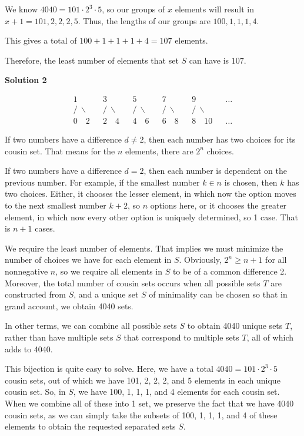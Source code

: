 \begin{enumerate}
 We know $4040 = 101 \cdot 2^3 \cdot 5$, so our groups of $x$ elements will result in $x+1 = 101, 2, 2, 2, 5$. Thus, the lengths of our groups are $100, 1, 1, 1, 4$.

 This gives a total of $100 + 1 + 1 + 1 + 4 = 107$ elements.

 Therefore, the least number of elements that set $S$ can have is $\boxed{107}$.

 



\textbf{Solution 2}


 \[\begin{array}{ccccccccccc} 1 & & 3 & & 5 & & 7 & & 9 & & \dots \\ / \ \backslash & & / \ \backslash & & / \ \backslash & & / \ \backslash & & / \ \backslash & & \\ 0 \quad 2 & & 2 \quad 4 & & 4 \quad 6 & & 6 \quad 8 & & 8 \quad 10 & & \dots \end{array}\]

 If two numbers have a difference $d \neq 2$, then each number has two choices for its cousin set. That means for the $n$ elements, there are $2^n$ choices.

 If two numbers have a difference $d = 2$, then each number is dependent on the previous number. For example, if the smallest number $k \in n$ is chosen, then $k$ has two choices. Either, it chooses the lesser element, in which now the option moves to the next smallest number $k+2$, so $n$ options here, or it chooses the greater element, in which now every other option is uniquely determined, so 1 case. That is $n+1$ cases.

 We require the least number of elements. That implies we must minimize the number of choices we have for each element in $S$. Obviously, $2^n \ge n+1$ for all nonnegative $n$, so we require all elements in $S$ to be of a common difference 2. Moreover, the total number of cousin sets occurs when all possible sets $T$ are constructed from $S$, and a unique set $S$ of minimality can be chosen so that in grand account, we obtain 4040 sets.

 In other terms, we can combine all possible sets $S$ to obtain 4040 unique sets $T$, rather than have multiple sets $S$ that correspond to multiple sets $T$, all of which adds to 4040. 

 This bijection is quite easy to solve. Here, we have a total $4040 = 101 \cdot 2^3 \cdot 5$ cousin sets, out of which we have 101, 2, 2, 2, and 5 elements in each unique cousin set. So, in $S$, we have 100, 1, 1, 1, and 4 elements for each cousin set. When we combine all of these into 1 set, we preserve the fact that we have 4040 cousin sets, as we can simply take the subsets of 100, 1, 1, 1, and 4 of these elements to obtain the requested separated sets $S$. 


\end{enumerate}
